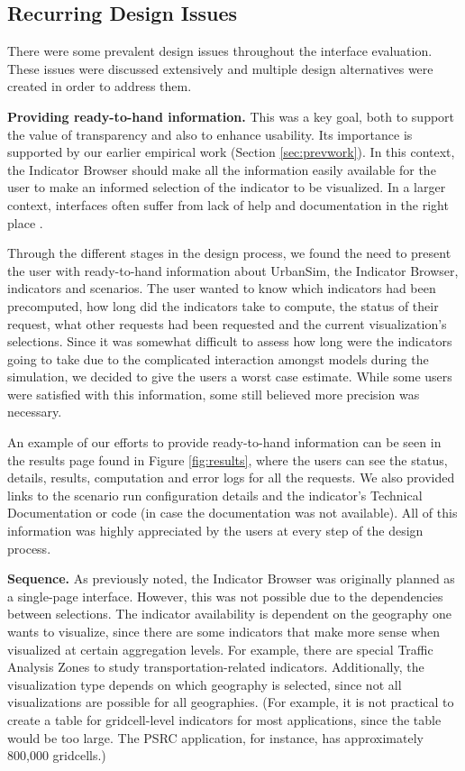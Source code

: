 
\subsection{Recurring Design Issues}

There were some prevalent design issues throughout the interface
evaluation. These issues were discussed extensively and multiple design
alternatives were created in order to address them.

{\bf Providing ready-to-hand information.} This was a key goal,
both to support the value of transparency and also 
to enhance usability.  Its importance
is supported by our earlier empirical work (Section \ref{sec:prevwork}).  In
this context, the Indicator Browser should make all the information easily
available for the user to make an informed selection of the indicator to be
visualized.  In a larger context, interfaces often suffer from lack
of help and documentation in the right place \cite{nielsen-book-1994}.

Through the different stages in the design process, we found the need to
present the user with ready-to-hand information about UrbanSim, the
Indicator Browser, indicators and scenarios. The user wanted to know which
indicators had been precomputed, how long did the indicators take to
compute, the status of their request, what other requests had been
requested and the current visualization's selections. Since it was somewhat
difficult to assess how long were the indicators going to take due to the
complicated interaction amongst models during the simulation, we decided to
give the users a worst case estimate.
While some users were satisfied with this information, some still believed
more precision was necessary.


An example of our efforts to provide ready-to-hand information can be seen
in the results page found in Figure \ref{fig:results}, where the users can
see the status, details, results, computation and error logs for all the
requests.  We also provided links to the scenario run configuration details
and the indicator's Technical Documentation or code (in case the
documentation was not available). All of this information was highly
appreciated by the users at every step of the design process.

{\bf Sequence.} As previously noted,
the Indicator Browser was originally planned as a single-page
interface. However, this was not possible due to the
dependencies between selections. The indicator availability is dependent on
the geography one wants to visualize, since there are some indicators that
make more sense when visualized at certain aggregation levels. For
example, there are special Traffic Analysis Zones to study
transportation-related indicators.  Additionally, the visualization type
depends on which geography is selected, since not all visualizations are
possible for all geographies.  (For example, it is not practical to create
a table for gridcell-level indicators for most applications, since the
table would be too large.  The PSRC application, for instance, has
approximately 800,000 gridcells.)

